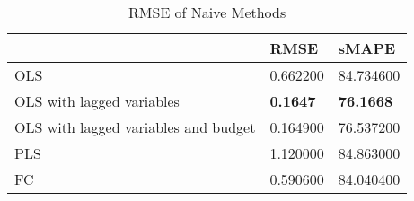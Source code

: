 \begin{table}[h!]
\centering
\caption{RMSE of Naive Methods}
\label{naive_rmse}
\begin{tabular}{lll}
\toprule
 & RMSE & sMAPE \\
\midrule
OLS & 0.662200 & 84.734600 \\
OLS with lagged variables & \textbf{0.1647} & \textbf{76.1668} \\
OLS with lagged variables and budget & 0.164900 & 76.537200 \\
PLS & 1.120000 & 84.863000 \\
FC & 0.590600 & 84.040400 \\
\bottomrule
\end{tabular}
\end{table}
